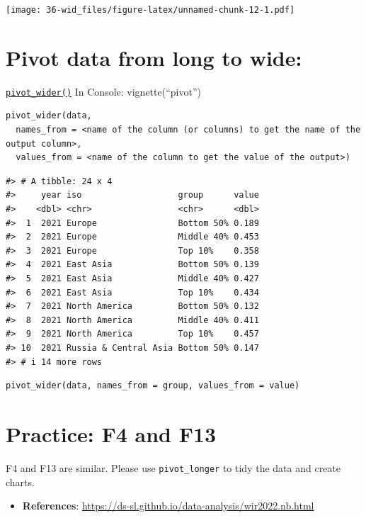 \documentclass[
  xelatex, ja=standard]{bxjsbook}
\providecommand{\tightlist}{%
  \setlength{\itemsep}{0pt}\setlength{\parskip}{0pt}}
\theoremstyle{definition}
\theoremstyle{definition}
\theoremstyle{definition}
\theoremstyle{definition}
\theoremstyle{remark}
\begin{document}
\texttt{[image: 36-wid\_files/figure-latex/unnamed-chunk-12-1.pdf]}

\hypertarget{pivot-data-from-long-to-wide}{%
\section{Pivot data from long to wide:}\label{pivot-data-from-long-to-wide}}

\href{https://tidyr.tidyverse.org/reference/pivot_wider.html}{\texttt{pivot\_wider()}} In Console: vignette(``pivot'')

\begin{verbatim}
pivot_wider(data, 
  names_from = <name of the column (or columns) to get the name of the output column>,
  values_from = <name of the column to get the value of the output>) 
\end{verbatim}

\begin{verbatim}
#> # A tibble: 24 x 4
#>     year iso                   group      value
#>    <dbl> <chr>                 <chr>      <dbl>
#>  1  2021 Europe                Bottom 50% 0.189
#>  2  2021 Europe                Middle 40% 0.453
#>  3  2021 Europe                Top 10%    0.358
#>  4  2021 East Asia             Bottom 50% 0.139
#>  5  2021 East Asia             Middle 40% 0.427
#>  6  2021 East Asia             Top 10%    0.434
#>  7  2021 North America         Bottom 50% 0.132
#>  8  2021 North America         Middle 40% 0.411
#>  9  2021 North America         Top 10%    0.457
#> 10  2021 Russia & Central Asia Bottom 50% 0.147
#> # i 14 more rows
\end{verbatim}

\begin{verbatim}
pivot_wider(data, names_from = group, values_from = value) 
\end{verbatim}

\hypertarget{practice-f4-and-f13}{%
\section{Practice: F4 and F13}\label{practice-f4-and-f13}}

F4 and F13 are similar. Please use \texttt{pivot\_longer} to tidy the data and create charts.

\begin{itemize}
\tightlist
\item
  \textbf{References}: \url{https://ds-sl.github.io/data-analysis/wir2022.nb.html}
\end{itemize}
\end{document}
